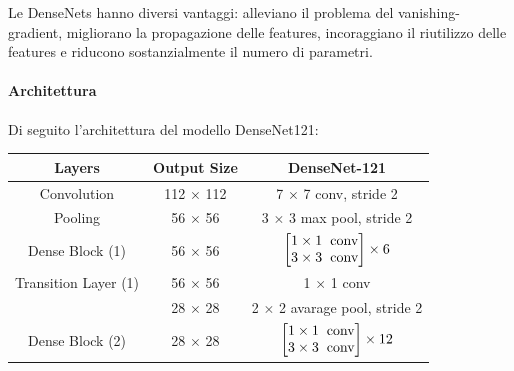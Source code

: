     Le DenseNets hanno diversi vantaggi: alleviano il problema del vanishing-gradient, migliorano la propagazione delle features, incoraggiano il riutilizzo delle features e riducono sostanzialmente il numero di parametri.
        
        \paragraph{Architettura}
        Di seguito l'architettura del modello DenseNet121:
            \begin{table}[!h]
                \centering
                \begin{tabular}{|c|c|c|}
                    \hline 
                    \rule[-3mm]{0mm}{8mm}
                    \textbf{Layers} & \textbf{Output Size} & \textbf{DenseNet-121} \\
                    \hline \hline
                    \rule[-3mm]{0mm}{8mm}
                    Convolution & 112 $\times$ 112 & 7 $\times$ 7 conv, stride 2 \\
                    \hline 
                    \rule[-3mm]{0mm}{8mm}
                    Pooling & 56 $\times$ 56 & 3 $\times$ 3 max pool, stride 2\\
                    \hline 
                    \rule[-6mm]{0mm}{1.4cm}
                    Dense Block  (1) & 56 $\times$ 56 & $\begin{bmatrix} 1 \times 1  \hspace{.2cm} \text{conv}\\ 3 \times 3 \hspace{.2cm} \text{conv} \end{bmatrix} \times 6 $ \\
                    \hline
                    \rule[-3mm]{0mm}{8mm}
                    Transition Layer (1) & 56 $\times$ 56 & 1 $\times$ 1 conv \\
                    \cline{2-3}
                    \rule[-3mm]{0mm}{8mm}
                    & 28 $\times$ 28 & 2 $\times$ 2 avarage pool, stride 2\\
                    \hline 
                    \rule[-6mm]{0mm}{1.4cm}
                    Dense Block  (2) & 28 $\times$ 28 & $\begin{bmatrix} 1 \times 1  \hspace{.2cm} \text{conv}\\ 3 \times 3 \hspace{.2cm} \text{conv} \end{bmatrix} \times 12 $ \\

\end{tabular}
\end{table}

